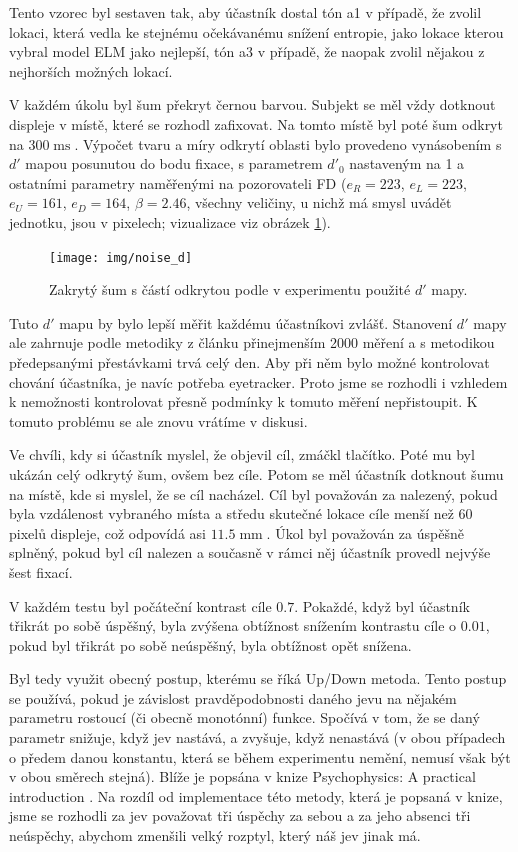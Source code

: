 Tento vzorec byl sestaven tak, aby účastník dostal tón a1 v případě, že zvolil
lokaci, která vedla ke stejnému očekávanému snížení entropie, jako lokace
kterou vybral model ELM jako nejlepší, tón a3 v případě, že naopak zvolil
nějakou z nejhorších možných lokací.

V každém úkolu byl šum překryt černou barvou. Subjekt se měl vždy dotknout
displeje v místě, které se rozhodl zafixovat. Na tomto místě byl poté šum
odkryt na $300 \operatorname{ms}$. Výpočet tvaru a míry odkrytí oblasti bylo
provedeno vynásobením s $d'$ mapou posunutou do bodu fixace, s parametrem
$d'_0$ nastaveným na 1 a ostatními parametry naměřenými na pozorovateli FD
($e_R=223$, $e_L=223$, $e_U = 161$, $e_D = 164$, $\beta=2.46$, všechny
veličiny, u nichž má smysl uvádět jednotku, jsou v pixelech; vizualizace viz obrázek \ref{Sumdprime}).

\begin{figure}
\centering
\texttt{[image: img/noise\_d]}
\caption{Zakrytý šum s částí odkrytou podle v experimentu použité $d'$ mapy.}
\label{Sumdprime}
\end{figure}

Tuto $d'$ mapu by bylo lepší měřit každému účastníkovi
zvlášť. Stanovení $d'$ mapy ale zahrnuje podle metodiky z článku \citep{Ellipse}
přinejmenším 2000 měření a s metodikou předepsanými přestávkami trvá celý den.
Aby při něm bylo možné kontrolovat chování účastníka, je navíc potřeba
eyetracker. Proto jsme se rozhodli i vzhledem k nemožnosti kontrolovat přesně
podmínky k tomuto měření nepřistoupit. K tomuto problému se ale znovu vrátíme
v diskusi.  

Ve chvíli, kdy si účastník myslel, že objevil cíl, zmáčkl tlačítko. Poté mu byl
ukázán celý odkrytý šum, ovšem bez cíle. Potom se měl účastník dotknout šumu na
místě, kde si myslel, že se cíl nacházel. Cíl byl považován za nalezený, pokud
byla vzdálenost vybraného místa a středu skutečné lokace cíle menší než 60
pixelů displeje, což odpovídá asi $11.5 \operatorname{mm}$. Úkol byl považován za úspěšně splněný, pokud byl cíl nalezen a
současně v rámci něj účastník provedl nejvýše šest fixací. 

V každém testu byl počáteční kontrast cíle $0.7$. Pokaždé, když byl účastník
třikrát po sobě úspěšný, byla zvýšena obtížnost snížením kontrastu cíle o
$0.01$, pokud byl třikrát po sobě neúspěšný, byla obtížnost opět snížena. 

Byl tedy využit obecný postup, kterému se říká Up/Down metoda. Tento postup se
používá, pokud je závislost pravděpodobnosti daného jevu na nějakém parametru
rostoucí (či obecně monotónní) funkce. Spočívá v tom, že se daný parametr
snižuje, když jev nastává, a zvyšuje, když nenastává (v obou případech o předem
danou konstantu, která se během experimentu nemění, nemusí však být v obou
směrech stejná). Blíže je popsána v knize Psychophysics: A practical
introduction \citep{psychophysics}.  Na rozdíl od implementace této metody,
která je popsaná v knize, jsme se rozhodli za jev považovat tři úspěchy za
sebou a za jeho absenci tři neúspěchy, abychom zmenšili velký rozptyl, který
náš jev jinak má.

